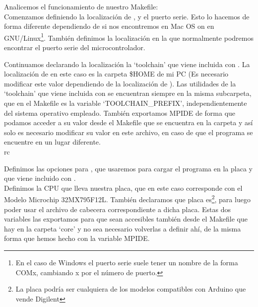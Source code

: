 

 Analicemos el funcionamiento de nuestro Makefile:\\
 
 Comenzamos definiendo la localización de ,  y el puerto serie. Esto lo hacemos de forma diferente dependiendo de si nos encontremos en Mac OS on en GNU/Linux\protect\footnote{En el caso de Windows el puerto serie suele tener un nombre de la forma COMx, cambiando x por el número de puerto.}. También definimos la localización en la que normalmente podremos encontrar el puerto serie del microcontrolador.
 
 
 Continuamos declarando la localización la `toolchain' que viene incluida con . La localización de  en este caso es la carpeta \$HOME de mi PC (Es necesario modificar este valor dependiendo de la localización de ). Las utilidades de la `toolchain' que viene incluida con  se encuentran siempre en la misma subcarpeta, que en el Makefile es la variable `TOOLCHAIN\_PREFIX', independientemente del sistema operativo empleado. También exportamos MPIDE de forma que podamos acceder a su valor desde el Makefile que se encuentra en la carpeta  y así solo es necesario modificar su valor en este archivo, en caso de que el programa se encuentre en un lugar diferente.\\
 rc
 
 Definimos las opciones para , que usaremos para cargar el programa en la placa y que viene incluido con .\\
 
 
 Definimos la CPU que lleva nuestra placa, que en este caso corresponde con el Modelo Microchip 32MX795F12L. También declaramos que placa es\protect\footnote{La placa podría ser cualquiera de los modelos compatibles con Arduino que vende Digilent}, para luego poder usar el archivo de cabecera correspondiente a dicha placa. Estas dos variables las exportamos para que sean accesibles también desde el Makefile que hay en la carpeta `core' y no sea necesario volverlas a definir ahí, de la misma forma que hemos hecho con la variable MPIDE.\\
 
